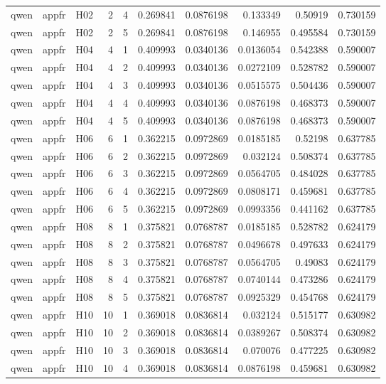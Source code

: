\begin{longtable}{lllrrrrrrr}
qwen & appfr & H02 & 2 & 4 & 0.269841 & 0.0876198 & 0.133349 & 0.50919 & 0.730159 \\
qwen & appfr & H02 & 2 & 5 & 0.269841 & 0.0876198 & 0.146955 & 0.495584 & 0.730159 \\
qwen & appfr & H04 & 4 & 1 & 0.409993 & 0.0340136 & 0.0136054 & 0.542388 & 0.590007 \\
qwen & appfr & H04 & 4 & 2 & 0.409993 & 0.0340136 & 0.0272109 & 0.528782 & 0.590007 \\
qwen & appfr & H04 & 4 & 3 & 0.409993 & 0.0340136 & 0.0515575 & 0.504436 & 0.590007 \\
qwen & appfr & H04 & 4 & 4 & 0.409993 & 0.0340136 & 0.0876198 & 0.468373 & 0.590007 \\
qwen & appfr & H04 & 4 & 5 & 0.409993 & 0.0340136 & 0.0876198 & 0.468373 & 0.590007 \\
qwen & appfr & H06 & 6 & 1 & 0.362215 & 0.0972869 & 0.0185185 & 0.52198 & 0.637785 \\
qwen & appfr & H06 & 6 & 2 & 0.362215 & 0.0972869 & 0.032124 & 0.508374 & 0.637785 \\
qwen & appfr & H06 & 6 & 3 & 0.362215 & 0.0972869 & 0.0564705 & 0.484028 & 0.637785 \\
qwen & appfr & H06 & 6 & 4 & 0.362215 & 0.0972869 & 0.0808171 & 0.459681 & 0.637785 \\
qwen & appfr & H06 & 6 & 5 & 0.362215 & 0.0972869 & 0.0993356 & 0.441162 & 0.637785 \\
qwen & appfr & H08 & 8 & 1 & 0.375821 & 0.0768787 & 0.0185185 & 0.528782 & 0.624179 \\
qwen & appfr & H08 & 8 & 2 & 0.375821 & 0.0768787 & 0.0496678 & 0.497633 & 0.624179 \\
qwen & appfr & H08 & 8 & 3 & 0.375821 & 0.0768787 & 0.0564705 & 0.49083 & 0.624179 \\
qwen & appfr & H08 & 8 & 4 & 0.375821 & 0.0768787 & 0.0740144 & 0.473286 & 0.624179 \\
qwen & appfr & H08 & 8 & 5 & 0.375821 & 0.0768787 & 0.0925329 & 0.454768 & 0.624179 \\
qwen & appfr & H10 & 10 & 1 & 0.369018 & 0.0836814 & 0.032124 & 0.515177 & 0.630982 \\
qwen & appfr & H10 & 10 & 2 & 0.369018 & 0.0836814 & 0.0389267 & 0.508374 & 0.630982 \\
qwen & appfr & H10 & 10 & 3 & 0.369018 & 0.0836814 & 0.070076 & 0.477225 & 0.630982 \\
qwen & appfr & H10 & 10 & 4 & 0.369018 & 0.0836814 & 0.0876198 & 0.459681 & 0.630982 \\

\end{longtable}
